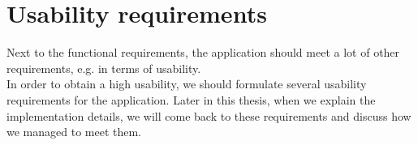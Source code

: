 \section{Usability requirements}\label{sec:usability-requirements}
Next to the functional requirements, the application should meet a lot of other requirements, e.g. in terms of usability.\\

In order to obtain a high usability, we should formulate several usability requirements for the application. Later in this thesis, when we explain the implementation details, we will come back to these requirements and discuss how we managed to meet them.

